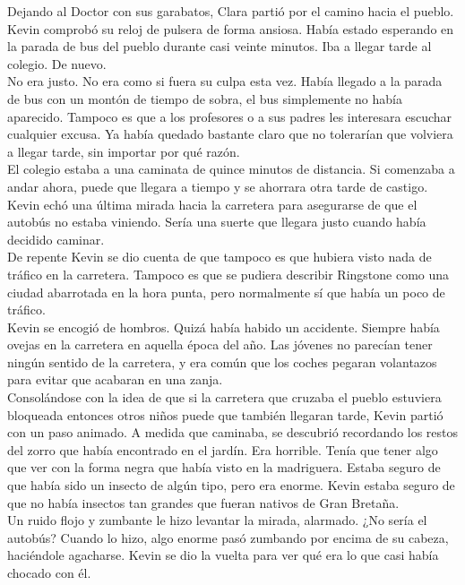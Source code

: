 {Dejando al Doctor con sus garabatos, Clara partió por el camino hacia el
pueblo.\\[2\baselineskip]Kevin comprobó su reloj de pulsera de forma
ansiosa. Había estado esperando en la parada de bus del pueblo durante
casi veinte minutos. Iba a llegar tarde al colegio. De nuevo. ~\\
No era justo. No era como si fuera su culpa esta vez. Había llegado a la
parada de bus con un montón de tiempo de sobra, el bus simplemente no
había aparecido. Tampoco es que a los profesores o a sus padres les
interesara escuchar cualquier excusa. Ya había quedado bastante claro
que no tolerarían que volviera a llegar tarde, sin importar por qué
razón.\\
El colegio estaba a una caminata de quince minutos de distancia. Si
comenzaba a andar ahora, puede que llegara a tiempo y se ahorrara otra
tarde de castigo.\\
Kevin echó una última mirada hacia la carretera para asegurarse de que
el autobús no estaba viniendo. Sería una suerte que llegara justo cuando
había decidido caminar.\\
De repente Kevin se dio cuenta de que tampoco es que hubiera visto nada
de tráfico en la carretera. Tampoco es que se pudiera describir
Ringstone como una ciudad abarrotada en la hora punta, pero normalmente
sí que había un poco de tráfico.\\
Kevin se encogió de hombros. Quizá había habido un accidente. Siempre
había ovejas en la carretera en aquella época del año. Las jóvenes no
parecían tener ningún sentido de la carretera, y era común que los
coches pegaran volantazos para evitar que acabaran en una zanja.\\
Consolándose con la idea de que si la carretera que cruzaba el pueblo
estuviera bloqueada entonces otros niños puede que también llegaran
tarde, Kevin partió con un paso animado. A medida que caminaba, se
descubrió recordando los restos del zorro que había encontrado en el
jardín. Era horrible. Tenía que tener algo que ver con la forma negra
que había visto en la madriguera. Estaba seguro de que había sido un
insecto de algún tipo, pero era enorme. Kevin estaba seguro de que no
había insectos tan grandes que fueran nativos de Gran Bretaña.\\
Un ruido flojo y zumbante le hizo levantar la mirada, alarmado. ¿No
sería el autobús? Cuando lo hizo, algo enorme pasó zumbando por encima
de su cabeza, haciéndole agacharse. Kevin se dio la vuelta para ver qué
era lo que casi había chocado con él.\\
}
